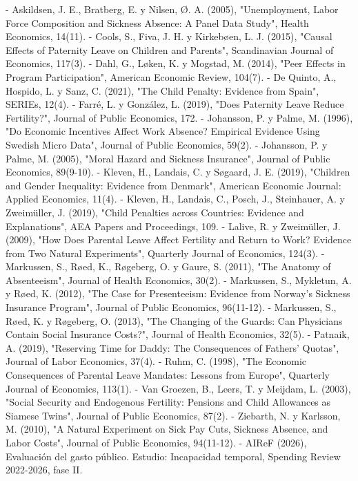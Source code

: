 \documentclass[10pt,a4paper]{article}
\begin{document}
- Askildsen, J. E., Bratberg, E. y Nilsen, Ø. A. (2005), "Unemployment, Labor Force Composition and Sickness Absence: A Panel Data Study", Health Economics, 14(11).
- Cools, S., Fiva, J. H. y Kirkebøen, L. J. (2015), "Causal Effects of Paternity Leave on Children and Parents", Scandinavian Journal of Economics, 117(3).
- Dahl, G., Løken, K. y Mogstad, M. (2014), "Peer Effects in Program Participation", American Economic Review, 104(7).
- De Quinto, A., Hospido, L. y Sanz, C. (2021), "The Child Penalty: Evidence from Spain", SERIEs, 12(4).
- Farré, L. y González, L. (2019), "Does Paternity Leave Reduce Fertility?", Journal of Public Economics, 172.
- Johansson, P. y Palme, M. (1996), "Do Economic Incentives Affect Work Absence? Empirical Evidence Using Swedish Micro Data", Journal of Public Economics, 59(2).
- Johansson, P. y Palme, M. (2005), "Moral Hazard and Sickness Insurance", Journal of Public Economics, 89(9-10).
- Kleven, H., Landais, C. y Søgaard, J. E. (2019), "Children and Gender Inequality: Evidence from Denmark", American Economic Journal: Applied Economics, 11(4).
- Kleven, H., Landais, C., Posch, J., Steinhauer, A. y Zweimüller, J. (2019), "Child Penalties across Countries: Evidence and Explanations", AEA Papers and Proceedings, 109.
- Lalive, R. y Zweimüller, J. (2009), "How Does Parental Leave Affect Fertility and Return to Work? Evidence from Two Natural Experiments", Quarterly Journal of Economics, 124(3).
- Markussen, S., Røed, K., Røgeberg, O. y Gaure, S. (2011), "The Anatomy of Absenteeism", Journal of Health Economics, 30(2).
- Markussen, S., Mykletun, A. y Røed, K. (2012), "The Case for Presenteeism: Evidence from Norway's Sickness Insurance Program", Journal of Public Economics, 96(11-12).
- Markussen, S., Røed, K. y Røgeberg, O. (2013), "The Changing of the Guards: Can Physicians Contain Social Insurance Costs?", Journal of Health Economics, 32(5).
- Patnaik, A. (2019), "Reserving Time for Daddy: The Consequences of Fathers' Quotas", Journal of Labor Economics, 37(4).
- Ruhm, C. (1998), "The Economic Consequences of Parental Leave Mandates: Lessons from Europe", Quarterly Journal of Economics, 113(1).
- Van Groezen, B., Leers, T. y Meijdam, L. (2003), "Social Security and Endogenous Fertility: Pensions and Child Allowances as Siamese Twins", Journal of Public Economics, 87(2).
- Ziebarth, N. y Karlsson, M. (2010), "A Natural Experiment on Sick Pay Cuts, Sickness Absence, and Labor Costs", Journal of Public Economics, 94(11-12).
- AIReF (2026), Evaluación del gasto público. Estudio: Incapacidad temporal, Spending Review 2022-2026, fase II.
\end{document}
